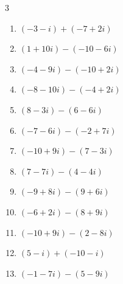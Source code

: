 \begin{multicols}{3}
\begin{enumerate}
  \item $\displaystyle (-3-i) + (-7+2i)$

        \phantom{$\displaystyle =-10+i$}

  \item $\displaystyle (1+10i) - (-10-6i)$

        \phantom{$\displaystyle =11+16i$}

  \item $\displaystyle (-4-9i) - (-10+2i)$

        \phantom{$\displaystyle =6-11i$}

  \item $\displaystyle (-8-10i) - (-4+2i)$

        \phantom{$\displaystyle =-4-12i$}

  \item $\displaystyle (8-3i) - (6-6i)$

        \phantom{$\displaystyle =2+3i$}

  \item $\displaystyle (-7-6i) - (-2+7i)$

        \phantom{$\displaystyle =-5-13i$}

  \item $\displaystyle (-10+9i) - (7-3i)$

        \phantom{$\displaystyle =-17+12i$}

  \item $\displaystyle (7-7i) - (4-4i)$

        \phantom{$\displaystyle =3-3i$}

  \item $\displaystyle (-9+8i) - (9+6i)$

        \phantom{$\displaystyle =-18+2i$}

  \item $\displaystyle (-6+2i) - (8+9i)$

        \phantom{$\displaystyle =-14-7i$}

\columnbreak %

  \item $\displaystyle (-10+9i) - (2-8i)$

        \phantom{$\displaystyle =-12+17i$}

  \item $\displaystyle (5-i) + (-10-i)$

        \phantom{$\displaystyle =-5-2i$}

  \item $\displaystyle (-1-7i) - (5-9i)$


\end{enumerate}
\end{multicols}
